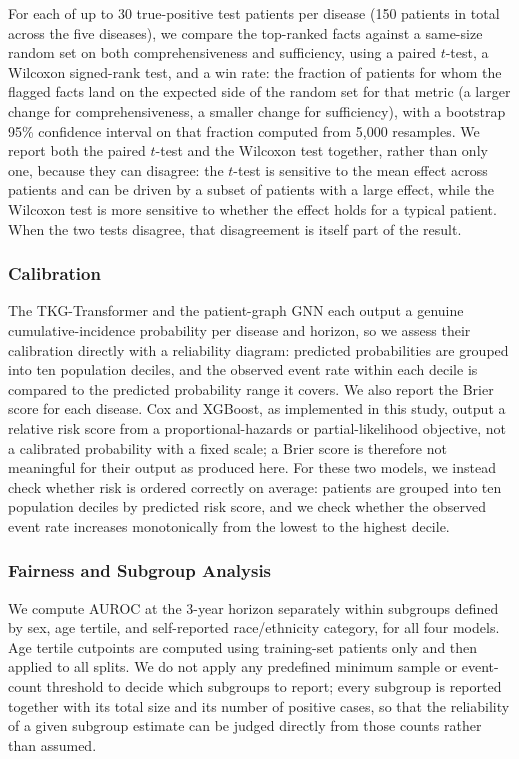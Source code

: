 For each of up to 30 true-positive test patients per disease (150 patients in total across the five diseases), we compare the top-ranked facts against a same-size random set on both comprehensiveness and sufficiency, using a paired $t$-test, a Wilcoxon signed-rank test, and a win rate: the fraction of patients for whom the flagged facts land on the expected side of the random set for that metric (a larger change for comprehensiveness, a smaller change for sufficiency), with a bootstrap 95\% confidence interval on that fraction computed from 5{,}000 resamples. We report both the paired $t$-test and the Wilcoxon test together, rather than only one, because they can disagree: the $t$-test is sensitive to the mean effect across patients and can be driven by a subset of patients with a large effect, while the Wilcoxon test is more sensitive to whether the effect holds for a typical patient. When the two tests disagree, that disagreement is itself part of the result.

\subsubsection{Calibration}
\label{sec:calibration}

The TKG-Transformer and the patient-graph GNN each output a genuine cumulative-incidence probability per disease and horizon, so we assess their calibration directly with a reliability diagram: predicted probabilities are grouped into ten population deciles, and the observed event rate within each decile is compared to the predicted probability range it covers. We also report the Brier score for each disease. Cox and XGBoost, as implemented in this study, output a relative risk score from a proportional-hazards or partial-likelihood objective, not a calibrated probability with a fixed scale; a Brier score is therefore not meaningful for their output as produced here. For these two models, we instead check whether risk is ordered correctly on average: patients are grouped into ten population deciles by predicted risk score, and we check whether the observed event rate increases monotonically from the lowest to the highest decile.

\subsubsection{Fairness and Subgroup Analysis}
\label{sec:fairness}

We compute AUROC at the 3-year horizon separately within subgroups defined by sex, age tertile, and self-reported race/ethnicity category, for all four models. Age tertile cutpoints are computed using training-set patients only and then applied to all splits. We do not apply any predefined minimum sample or event-count threshold to decide which subgroups to report; every subgroup is reported together with its total size and its number of positive cases, so that the reliability of a given subgroup estimate can be judged directly from those counts rather than assumed.
